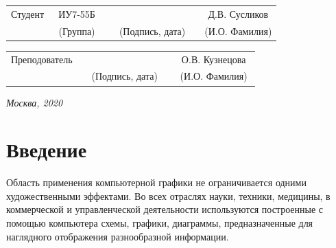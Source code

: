 \documentclass[14pt, a4paper]{extarticle}
\begin{document}
	
	\noindent
	\\
	
	\noindent
	\\
	
	\vspace{1.5cm}
	\noindent
	\begin{tabular}{l c c c c c}
		Студент      & ~ИУ7-55Б~               & \hspace{2.5cm} & \hspace{2cm}                 & &  Д.В. 
		Сусликов \\\cline{2-2}\cline{4-4} \cline{6-6} 
		\hspace{3cm} & {\footnotesize(Группа)} &                & {\footnotesize(Подпись, дата)} & & {\footnotesize(И.О. Фамилия)}
	\end{tabular}
	
	\noindent
	\begin{tabular}{l c c c c}
		Преподователь & \hspace{5cm}   & \hspace{2cm}                 & & ~О.В. Кузнецова~\\\cline{3-3} \cline{5-5} 
		\hspace{3cm}  &                & {\footnotesize(Подпись, дата)} & & {\footnotesize(И.О. Фамилия)}
	\end{tabular}
	
	\vspace{0.6cm}
	\begin{center}	
		\vfill
		\large \textit {Москва, 2020}
	\end{center}
	
	\thispagestyle {empty}
	\pagebreak	
	
	\clearpage
	\tableofcontents
	
	
	\clearpage
	\section*{Введение}
	Область применения компьютерной графики не ограничивается одними
	художественными эффектами. Во всех отраслях науки, техники, медицины,
	в коммерческой и управленческой деятельности используются построенные
	с помощью компьютера схемы, графики, диаграммы, предназначенные для
	наглядного отображения разнообразной информации.\par
	
\end{document}
